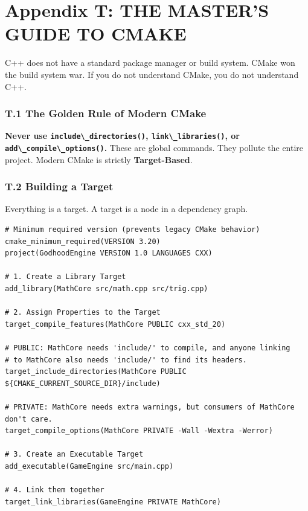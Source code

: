 \hypertarget{appendix-t-the-masters-guide-to-cmake}{%
\section{Appendix T: THE MASTER'S GUIDE TO
CMAKE}\label{appendix-t-the-masters-guide-to-cmake}}

C++ does not have a standard package manager or build system. CMake won
the build system war. If you do not understand CMake, you do not
understand C++.

\hypertarget{t.1-the-golden-rule-of-modern-cmake}{%
\subsubsection{T.1 The Golden Rule of Modern
CMake}\label{t.1-the-golden-rule-of-modern-cmake}}

\textbf{Never use \passthrough{\lstinline!include\_directories()!},
\passthrough{\lstinline!link\_libraries()!}, or
\passthrough{\lstinline!add\_compile\_options()!}.} These are global
commands. They pollute the entire project. Modern CMake is strictly
\textbf{Target-Based}.

\hypertarget{t.2-building-a-target}{%
\subsubsection{T.2 Building a Target}\label{t.2-building-a-target}}

Everything is a target. A target is a node in a dependency graph.

\begin{lstlisting}
# Minimum required version (prevents legacy CMake behavior)
cmake_minimum_required(VERSION 3.20)
project(GodhoodEngine VERSION 1.0 LANGUAGES CXX)

# 1. Create a Library Target
add_library(MathCore src/math.cpp src/trig.cpp)

# 2. Assign Properties to the Target
target_compile_features(MathCore PUBLIC cxx_std_20)

# PUBLIC: MathCore needs 'include/' to compile, and anyone linking 
# to MathCore also needs 'include/' to find its headers.
target_include_directories(MathCore PUBLIC ${CMAKE_CURRENT_SOURCE_DIR}/include)

# PRIVATE: MathCore needs extra warnings, but consumers of MathCore don't care.
target_compile_options(MathCore PRIVATE -Wall -Wextra -Werror)

# 3. Create an Executable Target
add_executable(GameEngine src/main.cpp)

# 4. Link them together
target_link_libraries(GameEngine PRIVATE MathCore)
\end{lstlisting}

